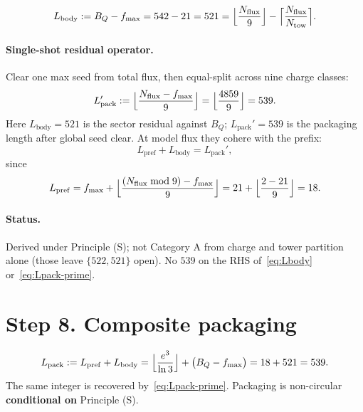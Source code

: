 \begin{equation}
\label{eq:Lbody}
L_{\mathrm{body}}
:=
B_{Q}-f_{\max}
=
542-21
=
521
=
\Bigl\lfloor\frac{N_{\mathrm{flux}}}{9}\Bigr\rfloor
-
\Bigl\lceil\frac{N_{\mathrm{flux}}}{N_{\mathrm{tow}}}\Bigr\rceil.
\end{equation}

\paragraph{Single-shot residual operator.}
Clear one max seed from total flux, then equal-split across nine charge classes:
\begin{equation}
\label{eq:Lpack-prime}
L_{\mathrm{pack}}'
:=
\Bigl\lfloor\frac{N_{\mathrm{flux}}-f_{\max}}{9}\Bigr\rfloor
=
\Bigl\lfloor\frac{4859}{9}\Bigr\rfloor
=
539.
\end{equation}
Here \(L_{\mathrm{body}}=521\) is the sector residual against \(B_{Q}\); \(L_{\mathrm{pack}}'=539\) is the packaging length after global seed clear. At model flux they cohere with the prefix:
\[
L_{\mathrm{pref}}+L_{\mathrm{body}}
=
L_{\mathrm{pack}}',
\]
since
\[
L_{\mathrm{pref}}
=
f_{\max}+\Bigl\lfloor\frac{(N_{\mathrm{flux}}\bmod 9)-f_{\max}}{9}\Bigr\rfloor
=
21+\Bigl\lfloor\frac{2-21}{9}\Bigr\rfloor
=
18.
\]

\paragraph{Status.} Derived under Principle (S); not Category A from charge and tower partition alone (those leave \(\{522,521\}\) open). No \(539\) on the RHS of~\eqref{eq:Lbody} or~\eqref{eq:Lpack-prime}.

\section{Step 8. Composite packaging}

\begin{equation}
\label{eq:Lpack}
L_{\mathrm{pack}}
:=
L_{\mathrm{pref}}+L_{\mathrm{body}}
=
\Bigl\lfloor\frac{e^{3}}{\ln 3}\Bigr\rfloor
+
\bigl(B_{Q}-f_{\max}\bigr)
=
18+521
=
539.
\end{equation}
The same integer is recovered by~\eqref{eq:Lpack-prime}. Packaging is non-circular \textbf{conditional on} Principle (S).

